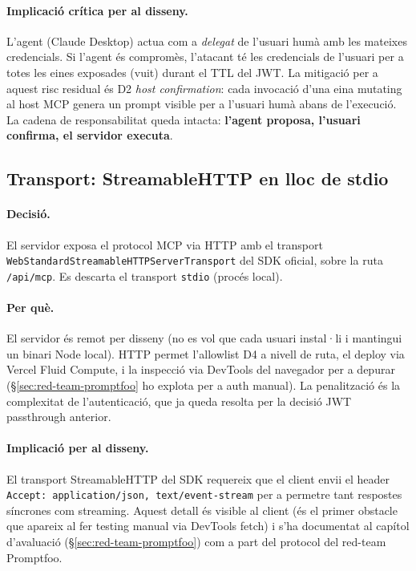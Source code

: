 \paragraph{Implicació crítica per al disseny.} L'agent (Claude Desktop) actua com a \emph{delegat} de l'usuari humà amb les mateixes credencials. Si l'agent és compromès, l'atacant té les credencials de l'usuari per a totes les eines exposades (vuit) durant el TTL del JWT. La mitigació per a aquest risc residual és D2 \emph{host confirmation}: cada invocació d'una eina mutating al host MCP genera un prompt visible per a l'usuari humà abans de l'execució. La cadena de responsabilitat queda intacta: \textbf{l'agent proposa, l'usuari confirma, el servidor executa}.

\subsection{Transport: StreamableHTTP en lloc de stdio}

\paragraph{Decisió.} El servidor exposa el protocol MCP via HTTP amb el transport \texttt{WebStandardStreamableHTTPServerTransport} del SDK oficial, sobre la ruta \texttt{/api/mcp}. Es descarta el transport \texttt{stdio} (procés local).

\paragraph{Per què.} El servidor és remot per disseny (no es vol que cada usuari instal·li i mantingui un binari Node local). HTTP permet l'allowlist D4 a nivell de ruta, el deploy via Vercel Fluid Compute, i la inspecció via DevTools del navegador per a depurar (\S\ref{sec:red-team-promptfoo} ho explota per a auth manual). La penalització és la complexitat de l'autenticació, que ja queda resolta per la decisió JWT passthrough anterior.

\paragraph{Implicació per al disseny.} El transport StreamableHTTP del SDK requereix que el client envii el header \texttt{Accept: application/json, text/event-stream} per a permetre tant respostes síncrones com streaming. Aquest detall és visible al client (és el primer obstacle que apareix al fer testing manual via DevTools fetch) i s'ha documentat al capítol d'avaluació (\S\ref{sec:red-team-promptfoo}) com a part del protocol del red-team Promptfoo.

